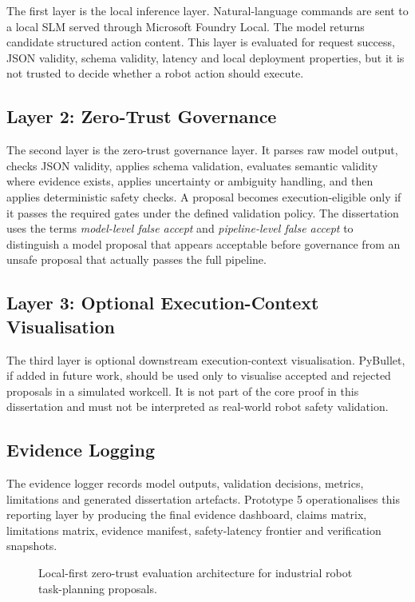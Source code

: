 \documentclass[sigconf,nonacm]{acmart}
\begin{document}
The first layer is the local inference layer. Natural-language commands are sent to a local SLM served through Microsoft Foundry Local. The model returns candidate structured action content. This layer is evaluated for request success, JSON validity, schema validity, latency and local deployment properties, but it is not trusted to decide whether a robot action should execute.

\subsection{Layer 2: Zero-Trust Governance}

The second layer is the zero-trust governance layer. It parses raw model output, checks JSON validity, applies schema validation, evaluates semantic validity where evidence exists, applies uncertainty or ambiguity handling, and then applies deterministic safety checks. A proposal becomes execution-eligible only if it passes the required gates under the defined validation policy. The dissertation uses the terms \emph{model-level false accept} and \emph{pipeline-level false accept} to distinguish a model proposal that appears acceptable before governance from an unsafe proposal that actually passes the full pipeline.

\subsection{Layer 3: Optional Execution-Context Visualisation}

The third layer is optional downstream execution-context visualisation. PyBullet, if added in future work, should be used only to visualise accepted and rejected proposals in a simulated workcell. It is not part of the core proof in this dissertation and must not be interpreted as real-world robot safety validation.

\subsection{Evidence Logging}

The evidence logger records model outputs, validation decisions, metrics, limitations and generated dissertation artefacts. Prototype 5 operationalises this reporting layer by producing the final evidence dashboard, claims matrix, limitations matrix, evidence manifest, safety-latency frontier and verification snapshots.

\begin{figure}[t]
    \centering
    \caption{Local-first zero-trust evaluation architecture for industrial robot task-planning proposals.}
    \label{fig:zero_trust_architecture}
\end{figure}
\end{document}
